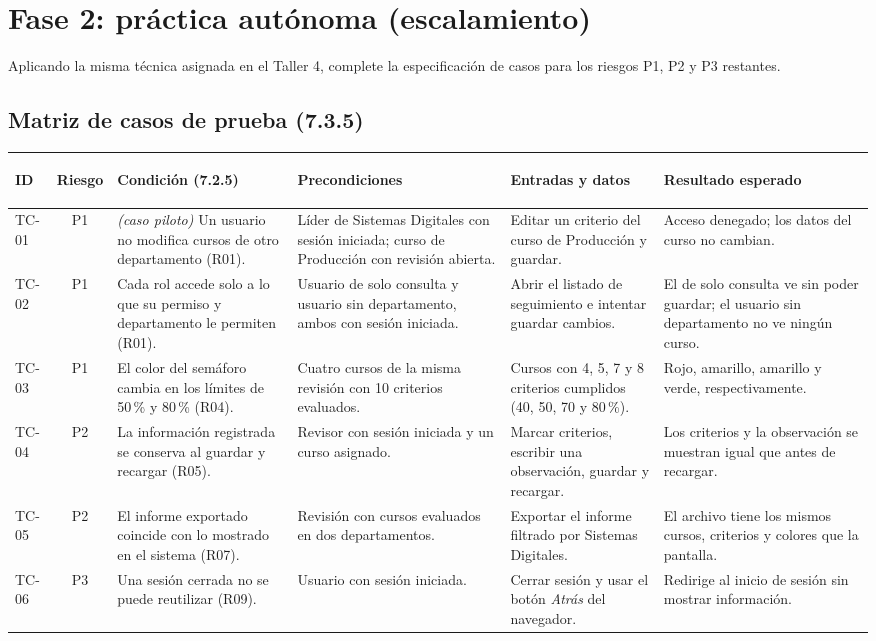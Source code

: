 \documentclass[11pt,a4paper]{article}
\newcommand{\tth}{\rowcolor{oscuro}}
\newcommand{\th}[1]{\color{white}\bfseries\rule{0pt}{0.85cm}#1}
\begin{document}
\section{Fase 2: práctica autónoma (escalamiento)}
Aplicando la misma técnica asignada en el Taller 4, complete la especificación de casos para los riesgos P1, P2 y P3 restantes.

\subsection{Matriz de casos de prueba (7.3.5)}
{\small
\begin{tabularx}{\linewidth}{|>{\ttfamily}l|c|Y|Y|Y|Y|}
\hline
\tth \th{\normalfont ID} & \th{Riesgo} & \th{Condición (7.2.5)} & \th{Precondiciones} & \th{Entradas y datos} & \th{Resultado esperado}\\\hline
TC-01 & P1 & \emph{(caso piloto)} Un usuario no modifica cursos de otro departamento (R01). & Líder de Sistemas Digitales con sesión iniciada; curso de Producción con revisión abierta. & Editar un criterio del curso de Producción y guardar. & Acceso denegado; los datos del curso no cambian.\\\hline
TC-02 & P1 & Cada rol accede solo a lo que su permiso y departamento le permiten (R01). & Usuario de solo consulta y usuario sin departamento, ambos con sesión iniciada. & Abrir el listado de seguimiento e intentar guardar cambios. & El de solo consulta ve sin poder guardar; el usuario sin departamento no ve ningún curso.\\\hline
TC-03 & P1 & El color del semáforo cambia en los límites de 50\,\% y 80\,\% (R04). & Cuatro cursos de la misma revisión con 10 criterios evaluados. & Cursos con 4, 5, 7 y 8 criterios cumplidos (40, 50, 70 y 80\,\%). & Rojo, amarillo, amarillo y verde, respectivamente.\\\hline
TC-04 & P2 & La información registrada se conserva al guardar y recargar (R05). & Revisor con sesión iniciada y un curso asignado. & Marcar criterios, escribir una observación, guardar y recargar. & Los criterios y la observación se muestran igual que antes de recargar.\\\hline
TC-05 & P2 & El informe exportado coincide con lo mostrado en el sistema (R07). & Revisión con cursos evaluados en dos departamentos. & Exportar el informe filtrado por Sistemas Digitales. & El archivo tiene los mismos cursos, criterios y colores que la pantalla.\\\hline
TC-06 & P3 & Una sesión cerrada no se puede reutilizar (R09). & Usuario con sesión iniciada. & Cerrar sesión y usar el botón \emph{Atrás} del navegador. & Redirige al inicio de sesión sin mostrar información.\\\hline
\end{tabularx}
}
\end{document}
